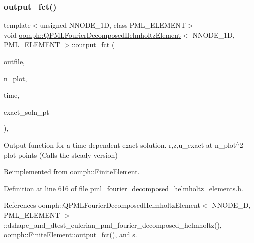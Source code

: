 \subsubsection{\texorpdfstring{output\+\_\+fct()}{output\_fct()}\hspace{0.1cm}{\footnotesize\ttfamily [2/2]}}
{\footnotesize\ttfamily template$<$unsigned N\+N\+O\+D\+E\+\_\+1D, class P\+M\+L\+\_\+\+E\+L\+E\+M\+E\+NT$>$ \\
void \hyperlink{classoomph_1_1QPMLFourierDecomposedHelmholtzElement}{oomph\+::\+Q\+P\+M\+L\+Fourier\+Decomposed\+Helmholtz\+Element}$<$ N\+N\+O\+D\+E\+\_\+1D, P\+M\+L\+\_\+\+E\+L\+E\+M\+E\+NT $>$\+::output\+\_\+fct (\begin{DoxyParamCaption}\item[{std\+::ostream \&}]{outfile,  }\item[{const unsigned \&}]{n\+\_\+plot,  }\item[{const double \&}]{time,  }\item[{\hyperlink{classoomph_1_1FiniteElement_ad4ecf2b61b158a4b4d351a60d23c633e}{Finite\+Element\+::\+Unsteady\+Exact\+Solution\+Fct\+Pt}}]{exact\+\_\+soln\+\_\+pt }\end{DoxyParamCaption})\hspace{0.3cm}{\ttfamily [inline]}, {\ttfamily [virtual]}}



Output function for a time-\/dependent exact solution. r,z,u\+\_\+exact at n\+\_\+plot$^\wedge$2 plot points (Calls the steady version) 



Reimplemented from \hyperlink{classoomph_1_1FiniteElement_a2a8426dccd57b927be0ae0eec00d0479}{oomph\+::\+Finite\+Element}.



Definition at line 616 of file pml\+\_\+fourier\+\_\+decomposed\+\_\+helmholtz\+\_\+elements.\+h.



References oomph\+::\+Q\+P\+M\+L\+Fourier\+Decomposed\+Helmholtz\+Element$<$ N\+N\+O\+D\+E\+\_\+D, P\+M\+L\+\_\+\+E\+L\+E\+M\+E\+N\+T $>$\+::dshape\+\_\+and\+\_\+dtest\+\_\+eulerian\+\_\+pml\+\_\+fourier\+\_\+decomposed\+\_\+helmholtz(), oomph\+::\+Finite\+Element\+::output\+\_\+fct(), and s.

\mbox{\label{classoomph_1_1QPMLFourierDecomposedHelmholtzElement_a2324f6992b4fe00f67684a2da86f999e}} 
